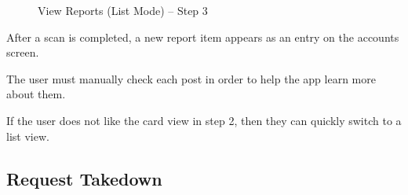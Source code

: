 \begin{figure}
\begin{minipage}{4.6cm}
    \caption{View Reports (List Mode) -- Step 3}
    \label{fig:ui_report_list_mode_step3}
  \end{minipage}
\end{figure}

\begin{minipage}{\textwidth}
  \centering
  \begin{minipage}[t]{4.6cm}
    \vspace{0pt}
    \centering
    \begin{minipage}{4.4cm}
      After a scan is completed, a new report item appears as an entry on the accounts screen.
    \end{minipage}
  \end{minipage}
  \begin{minipage}[t]{4.6cm}
    \vspace{0pt}
    \centering
    \begin{minipage}{4.4cm}
      The user must manually check each post in order to help the app learn more about them.
    \end{minipage}
  \end{minipage}
  \begin{minipage}[t]{4.6cm}
    \vspace{0pt}
    \centering
    \begin{minipage}{4.4cm}
      If the user does not like the card view in step 2, then they can quickly switch to a list view.
    \end{minipage}
  \end{minipage}
\end{minipage}

\clearpage

\subsection{Request Takedown}


